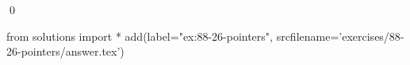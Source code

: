 
\begin{ex}
  \label{ex:88-26-pointers}
  
  \qed
\end{ex}
\begin{python0}
from solutions import *
add(label="ex:88-26-pointers",
    srcfilename='exercises/88-26-pointers/answer.tex')
\end{python0}
